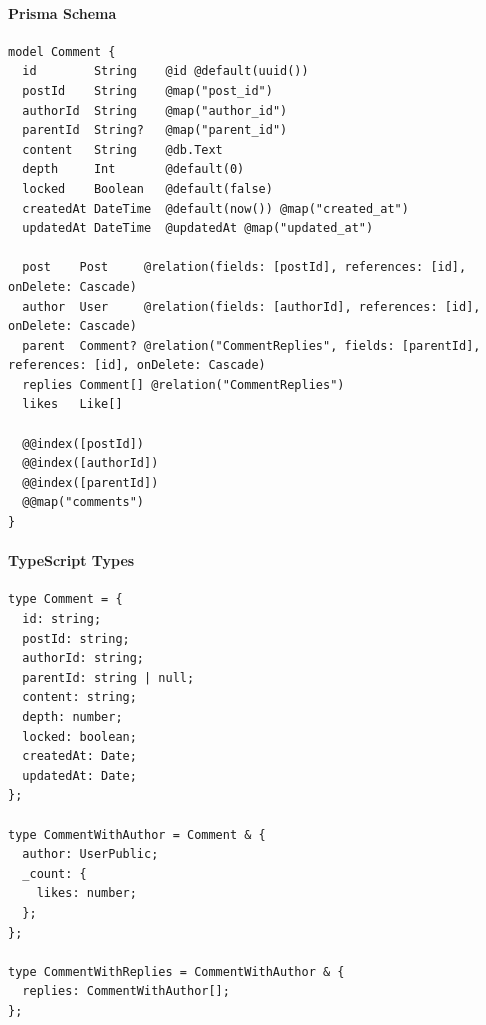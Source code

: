 \documentclass[11pt,a4paper]{article}
\begin{document}
\paragraph{Prisma Schema}
\begin{lstlisting}
model Comment {
  id        String    @id @default(uuid())
  postId    String    @map("post_id")
  authorId  String    @map("author_id")
  parentId  String?   @map("parent_id")
  content   String    @db.Text
  depth     Int       @default(0)
  locked    Boolean   @default(false)
  createdAt DateTime  @default(now()) @map("created_at")
  updatedAt DateTime  @updatedAt @map("updated_at")
  
  post    Post     @relation(fields: [postId], references: [id], onDelete: Cascade)
  author  User     @relation(fields: [authorId], references: [id], onDelete: Cascade)
  parent  Comment? @relation("CommentReplies", fields: [parentId], references: [id], onDelete: Cascade)
  replies Comment[] @relation("CommentReplies")
  likes   Like[]
  
  @@index([postId])
  @@index([authorId])
  @@index([parentId])
  @@map("comments")
}
\end{lstlisting}

\paragraph{TypeScript Types}
\begin{lstlisting}
type Comment = {
  id: string;
  postId: string;
  authorId: string;
  parentId: string | null;
  content: string;
  depth: number;
  locked: boolean;
  createdAt: Date;
  updatedAt: Date;
};

type CommentWithAuthor = Comment & {
  author: UserPublic;
  _count: {
    likes: number;
  };
};

type CommentWithReplies = CommentWithAuthor & {
  replies: CommentWithAuthor[];
};
\end{lstlisting}
\end{document}
